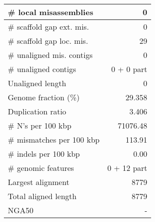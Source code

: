 \documentclass[12pt,a4paper]{article}
\begin{document}
\begin{table}[ht]
\begin{center}
\begin{tabular}{|l*{1}{|r}|}
\# local misassemblies & 0 \\ \hline
\# scaffold gap ext. mis. & 0 \\ \hline
\# scaffold gap loc. mis. & 29 \\ \hline
\# unaligned mis. contigs & 0 \\ \hline
\# unaligned contigs & 0 + 0 part \\ \hline
Unaligned length & 0 \\ \hline
Genome fraction (\%) & 29.358 \\ \hline
Duplication ratio & 3.406 \\ \hline
\# N's per 100 kbp & 71076.48 \\ \hline
\# mismatches per 100 kbp & 113.91 \\ \hline
\# indels per 100 kbp & 0.00 \\ \hline
\# genomic features & 0 + 12 part \\ \hline
Largest alignment & 8779 \\ \hline
Total aligned length & 8779 \\ \hline
NGA50 & - \\ \hline
\end{tabular}
\end{center}
\end{table}
\end{document}
